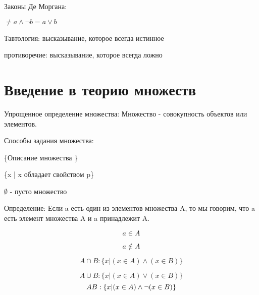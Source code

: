 \documentclass[a4paper]{article}
\begin{document}
Законы Де Моргана:

$\neq a \wedge \neg b = a \vee  b $

Тавтология: высказывание, которое всегда истинное

противоречие: высказывание, которое всегда ложно



\section*{Введение в теорию множеств}

Упрощенное определение множества: Множество - совокупность объектов или элементов.

Способы задания множества:

\{Описание множества \}

\{x | x  обладает свойством p\}

$\emptyset$ - пусто множество

Определение: Если a есть один из элементов множества A, то мы говорим, что a есть элемент множества A и a принадлежит A.

$$ a \in A$$

$$ a \not\in A$$

$$ A \cap B: \{x| ( x \in A) \wedge (x \in B)\}$$


$$ A \cup B: \{x| ( x \in A) \vee (x \in B)\}$$
$$ A \\ B: \{x| ( x \in A) \wedge \neg(x \in B)\}$$
\end{document}
